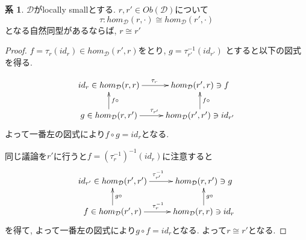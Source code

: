 \documentclass[dvipdfmx,a4paper,11pt]{article}
\theoremstyle{definition}
\newtheorem{cor}[thm]{系}
\begin{document}
 \begin{tcolorbox}
 [colback = white, colframe = green!35!black, fonttitle = \bfseries,breakable = true]
\begin{cor}
\label{cor-yoneda}
$\mathcal{D} $がlocally smallとする. $r, r' \in Ob(\mathcal{D})$について
$$
\tau : hom_{\mathcal{D}}(r, \cdot) \cong hom_{\mathcal{D}}(r', \cdot)
$$
となる自然同型があるならば, $r \cong r'$
\end{cor}
\end{tcolorbox}
\begin{proof}
$f = \tau_{r}(id_r) \in hom_{\mathcal{D}}(r',r)$をとり, 
$g = \tau_{r'}^{-1}(id_{r'})$
とすると以下の図式を得る.

\begin{equation*}
\xymatrix@C=25pt@R=20pt{
id_r \in hom_{\mathcal{D}}(r,r) \ar@{->}[r]^{\tau_{r}}
& hom_{\mathcal{D}}(r',r) \ni f\\
g \in hom_{\mathcal{D}}(r,r') \ar@{->}[r]^{\tau_{r'}} \ar@{->}[u]_{f \circ }
& hom_{\mathcal{D}}(r',r') \ar@{->}[u]_{f \circ } \ni id_{r'}\\   
}
\end{equation*}
よって一番左の図式により$f \circ g = id_{r}$となる.

同じ議論を$r'$に行うと$f = (\tau_{r}^{-1})^{-1}(id_r)$に注意すると
\begin{equation*}
\xymatrix@C=25pt@R=20pt{
id_{r'} \in hom_{\mathcal{D}}(r',r') \ar@{->}[r]^{\tau_{r'}^{-1}}
& hom_{\mathcal{D}}(r,r') \ni g\\
f \in hom_{\mathcal{D}}(r',r) \ar@{->}[r]^{\tau_{r}^{-1}} \ar@{->}[u]_{g\circ }
& hom_{\mathcal{D}}(r,r) \ar@{->}[u]_{g \circ } \ni id_{r}\\   
}
\end{equation*}
を得て, よって一番左の図式により$g \circ f= id_{r}$となる.
よって$r \cong r'$となる. 
\end{proof}
\end{document}
